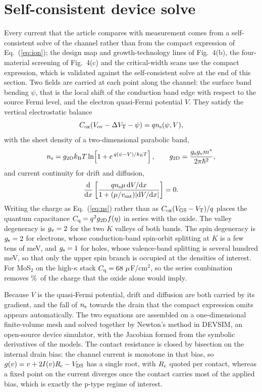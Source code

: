\documentclass[aip,apl,amsmath,amssymb,reprint,longbibliography]{revtex4-1}
\begin{document}
\section{Self-consistent device solve}
\label{sec:device}

Every current that the article compares with measurement comes from a
self-consistent solve of the channel rather than from the compact expression of
Eq.~(\ref{eq:ion}); the design map and growth-technology lines of Fig.~4(b),
the four-material screening of Fig.~4(c) and the critical-width scans use the
compact expression, which is validated against the self-consistent solve at the
end of this section. Two fields are carried at each point along the channel:
the surface band bending $\psi$, that is the local shift of the conduction band
edge with respect to the source Fermi level, and the electron quasi-Fermi
potential $V$. They satisfy the vertical electrostatic balance
\begin{equation}
C_{\rm ox}(V_{\rm ov}-\Delta V_{\rm T}-\psi)=qn_{\rm s}(\psi,V),
\label{eq:gate}
\end{equation}
with the sheet density of a two-dimensional parabolic band,
\begin{equation}
n_{\rm s}=g_{\rm 2D}k_{\rm B}T
\ln\!\left[1+e^{\,q(\psi-V)/k_{\rm B}T}\right],\qquad
g_{\rm 2D}=\frac{g_{\rm s}g_{\rm v}m^{*}}{2\pi\hbar^{2}},
\label{eq:ns}
\end{equation}
and current continuity for drift and diffusion,
\begin{equation}
\frac{\mathrm{d}}{\mathrm{d}x}
\left[\frac{qn_{\rm s}\mu\,\mathrm{d}V/\mathrm{d}x}
{1+(\mu/v_{\rm sat})|\mathrm{d}V/\mathrm{d}x|}\right]=0 .
\label{eq:cont}
\end{equation}
Writing the charge as Eq.~(\ref{eq:ns}) rather than as
$C_{\rm ox}(V_{\rm GS}-V_{\rm T})/q$ places the quantum capacitance
$C_{\rm q}=q^{2}g_{\rm 2D}f(\eta)$ in series with the oxide. The valley
degeneracy is $g_{\rm v}=2$ for the two $K$ valleys of both bands. The spin
degeneracy is $g_{\rm s}=2$ for electrons, whose conduction-band spin-orbit
splitting at $K$ is a few tens of meV, and $g_{\rm s}=1$ for holes, whose
valence-band splitting is several hundred meV, so that only the upper spin
branch is occupied at the densities of interest.\cite{Kormanyos2015} For MoS$_2$ on the
high-$\kappa$ stack $C_{\rm q}=68~\mu$F/cm$^{2}$, so the series combination
removes \ScCqCorr\%\ of the charge that the oxide alone would imply.

Because $V$ is the quasi-Fermi potential, drift and diffusion are both carried
by its gradient, and the fall of $n_{\rm s}$ towards the drain that the compact
expression omits appears automatically. The two equations are assembled on a
one-dimensional finite-volume mesh and solved together by Newton's method in
DEVSIM, an open-source device simulator, with the Jacobian formed from the
symbolic derivatives of the models.\cite{Sanchez2022} The contact resistance is
closed by bisection on the internal drain bias: the channel current is monotone
in that bias, so $g(v)=v+2I(v)R_{\rm c}-V_{\rm DS}$ has a single root, with $R_{\rm c}$
quoted per contact, whereas a
fixed point on the current diverges once the contact carries most of the
applied bias, which is exactly the p-type regime of interest.
\end{document}
